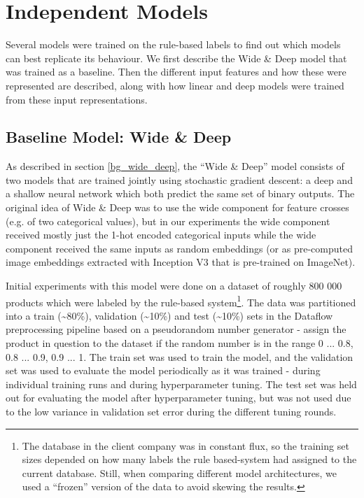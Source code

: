 \section{Independent Models}
\label{exp_models}

Several models were trained on the rule-based labels to find out which models can best replicate its behaviour.
We first describe the Wide \& Deep model that was trained as a baseline.
Then the different input features and how these were represented are described, along with how linear and deep models were trained from these input representations.

\subsection{Baseline Model: Wide \& Deep}
\label{widedeep}

As described in section \ref{bg_wide_deep}, the ``Wide \& Deep'' model consists of two models that are trained jointly using stochastic gradient descent: a deep and a shallow neural network which both predict the same set of binary outputs.
The original idea of Wide \& Deep was to use the wide component for feature crosses (e.g. of two categorical values), but in our experiments the wide component received mostly just the 1-hot encoded categorical inputs while the wide component received the same inputs as random embeddings (or as pre-computed image embeddings extracted with Inception V3 that is pre-trained on ImageNet).

Initial experiments with this model were done on a dataset of roughly 800 000 products which were labeled by the rule-based system\footnote{The database in the client company was in constant flux, so the training set sizes depended on how many labels the rule based-system had assigned to the current database. Still, when comparing different model architectures, we used a ``frozen'' version of the data to avoid skewing the results.}.
The data was partitioned into a train (\textasciitilde80\%), validation (\textasciitilde10\%) and test (\textasciitilde10\%) sets in the Dataflow preprocessing pipeline based on a pseudorandom number generator - assign the product in question to the dataset if the random number is in the range 0 ... 0.8, 0.8 ... 0.9, 0.9 ... 1.
The train set was used to train the model, and the validation set was used to evaluate the model periodically as it was trained - during individual training runs and during hyperparameter tuning.
The test set was held out for evaluating the model after hyperparameter tuning, but was not used due to the low variance in validation set error during the different tuning rounds.

